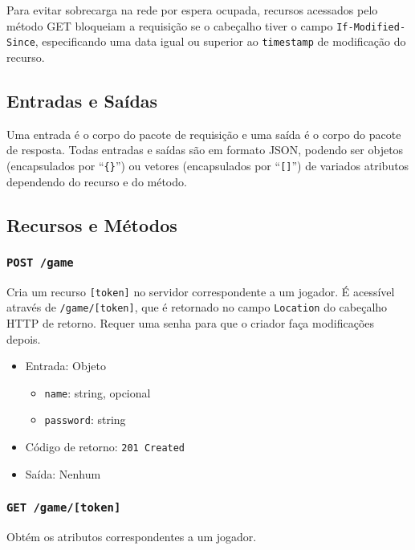 \documentclass[12pt,a4paper]{article}
\begin{document}
Para evitar sobrecarga na rede por espera ocupada, recursos acessados pelo
método GET bloqueiam a requisição se o cabeçalho tiver o campo
\texttt{If-Modified-Since}, especificando uma data igual ou superior ao
\texttt{timestamp} de modificação do recurso.

\subsection{Entradas e Saídas}

Uma entrada é o corpo do pacote de requisição e uma saída é o corpo do pacote
de resposta. Todas entradas e saídas são em formato JSON, podendo ser objetos
(encapsulados por ``\texttt{\{\}}'') ou vetores (encapsulados por
``\texttt{[]}'') de variados atributos dependendo do recurso e do método.

\subsection{Recursos e Métodos}

\subsubsection{\texttt{POST /game}}

Cria um recurso \texttt{[token]} no servidor correspondente a um jogador. É
acessível através de \texttt{/game/[token]}, que é retornado no campo
\texttt{Location} do cabeçalho HTTP de retorno. Requer uma senha para que o
criador faça modificações depois.

\begin{itemize}
	\item Entrada: Objeto
		\begin{itemize}
			\item \texttt{name}: string, opcional
			\item \texttt{password}: string
		\end{itemize}
	\item Código de retorno: \texttt{201 Created}
	\item Saída: Nenhum
\end{itemize}

\subsubsection{\texttt{GET /game/[token]}}

Obtém os atributos correspondentes a um jogador.
\end{document}
